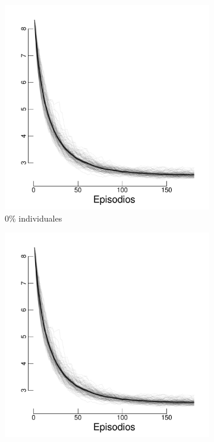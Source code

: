 \documentclass[a4paper,11pt]{book}
\theoremstyle{definition}
\begin{document}
\begin{figure}[H]
\centering
  \begin{subfigure}[t]{0.32\textwidth}
  \includegraphics[page=3,width=\textwidth]{static/truesynergy/expH5.pdf}
  \caption{\scriptsize 0\% individuales}\label{H5_mu}
  \end{subfigure}
  \begin{subfigure}[t]{0.32\textwidth}
  \includegraphics[page=2,width=\textwidth]{static/truesynergy/expH5.pdf}

\end{subfigure}
\end{figure}
\end{document}

